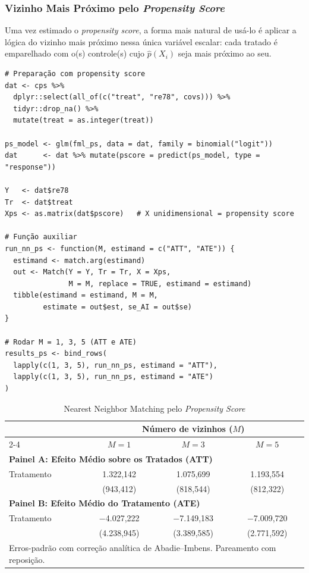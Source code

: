 \documentclass[12pt,a4paper]{article}
\begin{document}
\subsubsection{Vizinho Mais Próximo pelo \textit{Propensity Score}}

Uma vez estimado o \textit{propensity score}, a forma mais natural de usá-lo é aplicar a lógica do vizinho mais próximo nessa única variável escalar: cada tratado é emparelhado com o(s) controle(s) cujo $\hat{p}(X_i)$ seja mais próximo ao seu.

\begin{lstlisting}[style=Rstyle]
# Preparação com propensity score
dat <- cps %>%
  dplyr::select(all_of(c("treat", "re78", covs))) %>%
  tidyr::drop_na() %>%
  mutate(treat = as.integer(treat))

ps_model <- glm(fml_ps, data = dat, family = binomial("logit"))
dat      <- dat %>% mutate(pscore = predict(ps_model, type = "response"))

Y   <- dat$re78
Tr  <- dat$treat
Xps <- as.matrix(dat$pscore)   # X unidimensional = propensity score

# Função auxiliar
run_nn_ps <- function(M, estimand = c("ATT", "ATE")) {
  estimand <- match.arg(estimand)
  out <- Match(Y = Y, Tr = Tr, X = Xps,
               M = M, replace = TRUE, estimand = estimand)
  tibble(estimand = estimand, M = M,
         estimate = out$est, se_AI = out$se)
}

# Rodar M = 1, 3, 5 (ATT e ATE)
results_ps <- bind_rows(
  lapply(c(1, 3, 5), run_nn_ps, estimand = "ATT"),
  lapply(c(1, 3, 5), run_nn_ps, estimand = "ATE")
)
\end{lstlisting}

\begin{table}[H]
\centering
\caption{Nearest Neighbor Matching pelo \textit{Propensity Score}}\label{tab:nn_ps}
\begin{tabular}{lccc}
\toprule
 & \multicolumn{3}{c}{Número de vizinhos ($M$)} \\
\cmidrule(lr){2-4}
 & $M=1$ & $M=3$ & $M=5$ \\
\midrule
\multicolumn{4}{l}{\textbf{Painel A: Efeito Médio sobre os Tratados (ATT)}} \\
\midrule
Tratamento & 1.322,142 & 1.075,699 & 1.193,554 \\
           & (943,412) & (818,544) & (812,322) \\
\midrule
\multicolumn{4}{l}{\textbf{Painel B: Efeito Médio do Tratamento (ATE)}} \\
\midrule
Tratamento & $-$4.027,222 & $-$7.149,183 & $-$7.009,720 \\
           & (4.238,945)  & (3.389,585)  & (2.771,592)  \\
\bottomrule
\multicolumn{4}{l}{\footnotesize Erros-padrão com correção analítica de Abadie--Imbens. Pareamento com reposição.}\\
\end{tabular}
\end{table}
\end{document}
